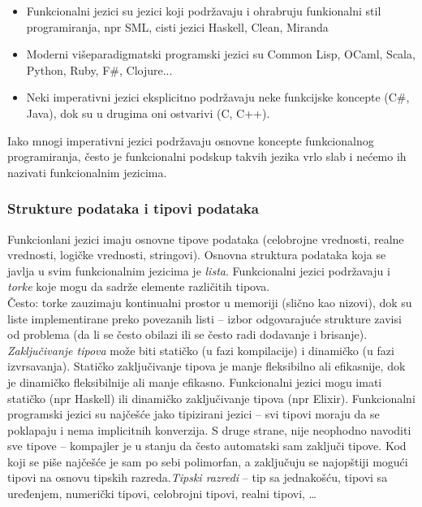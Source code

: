 \documentclass[../main.tex]{subfiles}
\begin{document}
	   \begin{itemize}
	   \item Funkcionalni jezici su jezici koji podržavaju i ohrabruju funkionalni stil programiranja, npr SML, cisti jezici Haskell, Clean, Miranda
	   \item Moderni višeparadigmatski programski jezici su Common Lisp, OCaml, Scala, Python, Ruby, F\#, Clojure...
	   \item Neki imperativni jezici eksplicitno podržavaju neke funkcijske koncepte (C\#, Java), dok su u drugima oni ostvarivi (C, C++).
	   
	   \end{itemize}
	   Iako mnogi imperativni jezici podržavaju osnovne koncepte funkcionalnog programiranja, često je funkcionalni podskup takvih jezika vrlo slab i nećemo ih nazivati funkcionalnim jezicima.

	   \subsubsection{Strukture podataka i tipovi podataka}					%
	   
	   Funkcionlani jezici imaju osnovne tipove podataka (celobrojne vrednosti, realne vrednosti, logičke vrednosti, stringovi). Osnovna struktura podataka koja se javlja u svim funkcionalnim jezicima je {\it lista}. Funkcionalni jezici podržavaju i {\it torke} koje mogu da sadrže elemente različitih tipova. 
	   \\
	   Često: torke zauzimaju kontinualni prostor u memoriji (slično kao nizovi), dok su liste implementirane preko povezanih listi -- izbor odgovarajuće strukture zavisi od problema (da li se često obilazi ili se često radi dodavanje i brisanje).
	   \\
	   {\it Zaključivanje tipova} može biti statičko (u fazi kompilacije) i dinamičko (u fazi izvrsavanja). Statičko zaključivanje tipova je manje fleksibilno ali efikasnije, dok je dinamičko fleksibilnije ali manje efikasno. Funkcionalni jezici mogu imati statičko (npr Haskell) ili dinamičko zaključivanje tipova (npr Elixir). Funkcionalni programski jezici su najčešće jako tipizirani jezici -- svi tipovi moraju da se poklapaju i nema implicitnih konverzija. S druge strane, nije neophodno navoditi sve tipove -- kompajler je u stanju da često automatski sam zaključi tipove. Kod koji se piše najčešće je sam po sebi polimorfan, a zaključuju se najopštiji mogući tipovi na osnovu tipskih razreda.{\it Tipski razredi} -- tip sa jednakošću, tipovi sa uređenjem, numerički tipovi, celobrojni tipovi, realni tipovi, \ldots
	   
\end{document}
